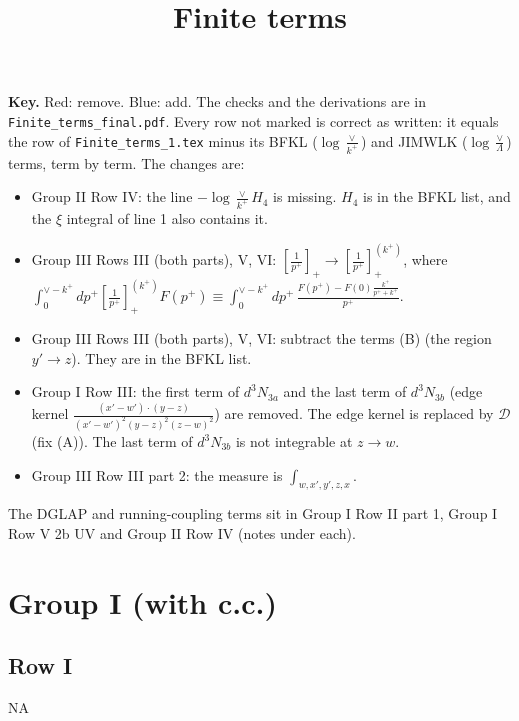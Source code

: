 \documentclass[9pt]{article}
\title{Finite terms \new{(checked: red = remove, blue = add)}}
\author{}
\date{}
\newcommand{\new}[1]{{\color{blue}#1}}
\numberwithin{equation}{section}
\begin{document}
\maketitle
\sloppy
\new{\noindent\textbf{Key.} Red: remove. Blue: add. The checks and the derivations are in \texttt{Finite\_terms\_final.pdf}. Every row not marked is correct as written: it equals the row of \texttt{Finite\_terms\_1.tex} minus its BFKL ($\log\frac{\vee}{k^+}$) and JIMWLK ($\log\frac{\vee}{\Lambda}$) terms, term by term. The changes are:
\begin{itemize}
\item[C1] Group II Row IV: the line $-\log\frac{\vee}{k^+}H_4$ is missing. $H_4$ is in the BFKL list, and the $\xi$ integral of line 1 also contains it.
\item[C2] Group III Rows III (both parts), V, VI: $\left[\frac{1}{p^+}\right]_+\to\left[\frac{1}{p^+}\right]_+^{(k^+)}$, where
$\int_0^{\vee-k^+}dp^+\left[\frac{1}{p^+}\right]_+^{(k^+)}F(p^+)\equiv\int_0^{\vee-k^+}dp^+\,\frac{F(p^+)-F(0)\frac{k^+}{p^++k^+}}{p^+}$.
\item[C3] Group III Rows III (both parts), V, VI: subtract the terms (B) (the region $y'\to z$). They are in the BFKL list.
\item[C4] Group I Row III: the first term of $d^3N_{3a}$ and the last term of $d^3N_{3b}$ (edge kernel $\frac{(x'-w')\cdot(y-z)}{(x'-w')^2(y-z)^2(z-w)^2}$) are removed. The edge kernel is replaced by $\mathcal D$ (fix (A)). The last term of $d^3N_{3b}$ is not integrable at $z\to w$.
\item[C5] Group III Row III part 2: the measure is $\int_{w,x',y',z,x}$.
\end{itemize}
The DGLAP and running-coupling terms sit in Group I Row II part 1, Group I Row V 2b UV and Group II Row IV (notes under each).}
\section{Group I (with c.c.)}
\subsection{Row I}
\textsc{NA}
\end{document}

